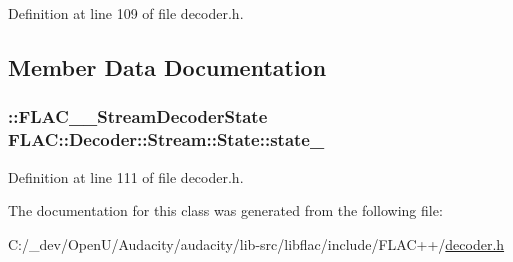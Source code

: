 Definition at line 109 of file decoder.\+h.



\subsection{Member Data Documentation}
\subsubsection[{\texorpdfstring{state\+\_\+}{state_}}]{\setlength{\rightskip}{0pt plus 5cm}\+::{\bf F\+L\+A\+C\+\_\+\+\_\+\+Stream\+Decoder\+State} F\+L\+A\+C\+::\+Decoder\+::\+Stream\+::\+State\+::state\+\_\+\hspace{0.3cm}{\ttfamily [protected]}}\hypertarget{class_f_l_a_c_1_1_decoder_1_1_stream_1_1_state_a7556fad1c76397875bb059c5875ff4a7}{}\label{class_f_l_a_c_1_1_decoder_1_1_stream_1_1_state_a7556fad1c76397875bb059c5875ff4a7}


Definition at line 111 of file decoder.\+h.



The documentation for this class was generated from the following file\+:\begin{DoxyCompactItemize}
\item 
C\+:/\+\_\+dev/\+Open\+U/\+Audacity/audacity/lib-\/src/libflac/include/\+F\+L\+A\+C++/\hyperlink{libflac_2include_2_f_l_a_c_09_09_2decoder_8h}{decoder.\+h}\end{DoxyCompactItemize}
